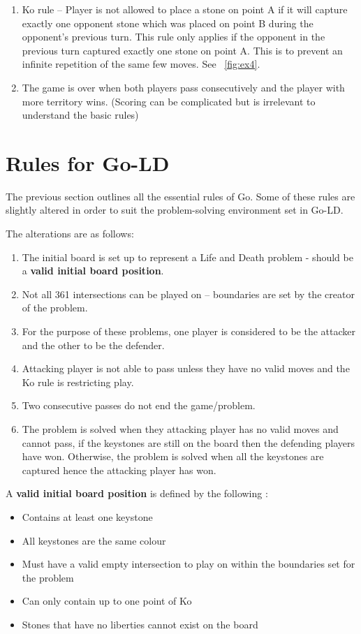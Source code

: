 \documentclass{l4proj}
\newcommand{\bo}[1]{\textbf{#1}}
\begin{document}
\begin{enumerate}
  \item Ko rule – Player is not allowed to place a stone on point A if it will capture exactly one opponent stone which was placed on point B during the opponent’s previous turn. This rule only applies if the opponent in the previous turn captured exactly one stone on point A. This is to prevent an infinite repetition of the same few moves. See ~\autoref{fig:ex4}.

  \item The game is over when both players pass consecutively and the player with more territory wins. (Scoring can be complicated but is irrelevant to understand the basic rules)

\end{enumerate}




\section{Rules for Go-LD}
The previous section outlines all the essential rules of Go. Some of these rules are slightly altered in order to suit the problem-solving environment set in Go-LD.

The alterations are as follows:
\begin{enumerate}

\item The initial board is set up to represent a Life and Death problem - should be a \bo{valid initial board position}.
\item Not all 361 intersections can be played on – boundaries are set by the creator of the problem.
\item For the purpose of these problems, one player is considered to be the attacker and the other to be the defender.
\item Attacking player is not able to pass unless they have no valid moves and the Ko rule is restricting play.
\item Two consecutive passes do not end the game/problem.
\item The problem is solved when they attacking player has no valid moves and cannot pass, if the keystones are still on the board then the defending players have won. Otherwise, the problem is solved when all the keystones are captured hence the attacking player has won.

\end{enumerate}


\bigskip
A \bo{valid initial board position} is defined by the following :
\begin{itemize}
\item Contains at least one keystone
\item All keystones are the same colour
\item Must have a valid empty intersection to play on within the boundaries set for the problem
\item Can only contain up to one point of Ko
\item Stones that have no liberties cannot exist on the board
\end{itemize}
\end{document}
